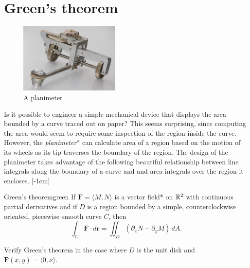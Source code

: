 \documentclass[svgnames]{watsonbook}
\begin{document}
\section{Green's theorem} \label{sec:greens}


\begin{figure}
  \includegraphics[width=5cm]{figures/planimeter}
  \caption{A planimeter \label{fig:planimeter}}
\end{figure}

Is it possible to engineer a simple mechanical device that displays
the area bounded by a curve traced out on paper? This seems
surprising, since computing the area would seem to require some
inspection of the region inside the curve. However, the
\textit{planimeter}* can calculate area of a region based on the
motion of its wheels as its tip traverses the boundary of the region. The
design of the planimeter takes advantage of the following beautiful
relationship between line integrals along the boundary of a curve and
and area integrals over the region it encloses. [-1cm]

\begin{theo}{Green's theorem}{green}
  If $\mathbf{F} = \langle M, N\rangle$ is a vector field* on $\mathbb{R}^2$
  with continuous partial derivatives and if $D$ is a region bounded by a
  simple, counterclockwise oriented, piecewise smooth curve $C$, then
  \[
    \int_C \mathbf{F} \cdot d\mathbf{r} = \iint_D \left(\partial_x N -
      \partial_y M \right) \, dA. 
  \]
\end{theo}

\begin{example}{}{}
  Verify Green's theorem in the case where $D$ is the unit disk and
  $\mathbf{F}(x,y)= \langle 0, x \rangle$. 
\end{example}
\end{document}
